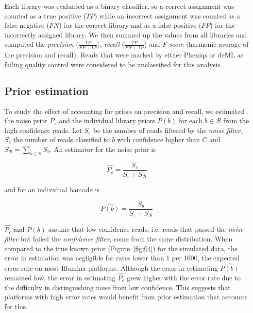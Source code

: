 \documentclass[10pt,twocolumn]{article}
\begin{document}
Each library was evaluated as a binary classifier, so a correct assignment was counted as a true positive ($TP$) while an incorrect assignment was counted as a false negative ($FN$) for the correct library and as a false positive ($FP$) for the incorrectly assigned library. We then summed up the values from all libraries and computed the \emph{precision} ($\frac{TP}{FP + TP}$), \emph{recall} ($\frac{TP}{FN + TP}$) and \emph{F-score} (harmonic average of the precision and recall). Reads that were marked by either Pheniqs or deML as failing quality control were considered to be unclassified for this analysis.

\subsection*{Prior estimation}
To study the effect of accounting for priors on precision and recall, we estimated the noise prior $P_{\varepsilon}$ and the individual library priors $P(b)$ for each $b \in \mathcal{B}$ from the high confidence reads. Let $S_{\varepsilon}$ be the number of reads filtered by the \emph{noise filter}, $S_{b}$ the number of reads classified to $b$ with confidence higher than $C$ and $S_\mathcal{B} = \sum_{b \in \mathcal{B}} S_{b}$. An estimator for the noise prior is

%
\begin{equation}
\hat{P_{\varepsilon}} = \frac{S_{\varepsilon}}{S_{\varepsilon} + S_\mathcal{B}}
\end{equation}
%

and for an individual barcode is

%
\begin{equation}
\hat{P(b)} = \frac{S_{b}}{S_{\varepsilon} + S_\mathcal{B}}
\end{equation}
%

$\hat{P_{\varepsilon}}$ and $\hat{P(b)}$ assume that low confidence reads, i.e. reads that passed the  \emph{noise filter} but failed the \emph{confidence filter}, come from the same distribution. When compared to the true known prior (Figure~\ref{fig:04}) for the simulated data, the error in estimation was negligible for rates lower than 1 per 1000, the expected error rate on most Illumina platforms. Although the error in estimating $\hat{P(b)}$ remained low, the error in estimating $\hat{P_{\varepsilon}}$ grew higher with the error rate due to the difficulty in distinguishing noise from low confidence. This suggests that platforms with high error rates would benefit from prior estimation that accounts for this.
\end{document}
